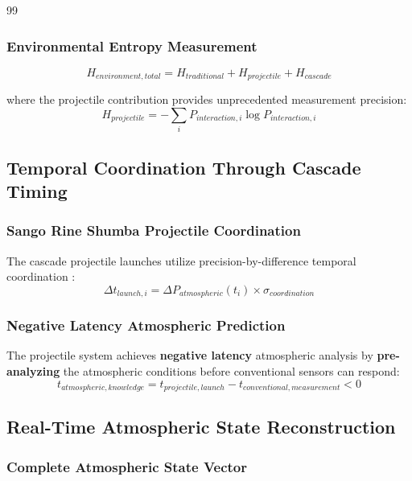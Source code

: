 \documentclass[12pt,a4paper]{article}
\begin{document}
\begin{thebibliography}{99}
\subsubsection{Environmental Entropy Measurement}
\begin{equation}
H_{environment,total} = H_{traditional} + H_{projectile} + H_{cascade}
\end{equation}

where the projectile contribution provides unprecedented measurement precision:
\begin{equation}
H_{projectile} = -\sum_{i} P_{interaction,i} \log P_{interaction,i}
\end{equation}

\subsection{Temporal Coordination Through Cascade Timing}

\subsubsection{Sango Rine Shumba Projectile Coordination}

The cascade projectile launches utilize precision-by-difference temporal coordination \cite{sango_rine_shumba}:
\begin{equation}
\Delta t_{launch,i} = \Delta P_{atmospheric}(t_i) \times \sigma_{coordination}
\end{equation}

\subsubsection{Negative Latency Atmospheric Prediction}

The projectile system achieves \textbf{negative latency} atmospheric analysis by \textbf{pre-analyzing} the atmospheric conditions before conventional sensors can respond:
\begin{equation}
t_{atmospheric,knowledge} = t_{projectile,launch} - t_{conventional,measurement} < 0
\end{equation}

\subsection{Real-Time Atmospheric State Reconstruction}

\subsubsection{Complete Atmospheric State Vector}


\end{thebibliography}
\end{document}
